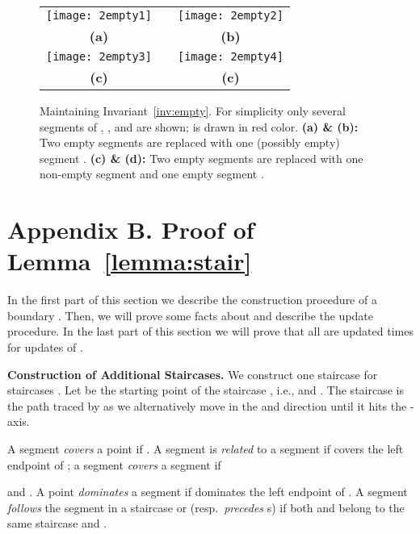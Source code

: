 \documentclass[10pt]{llncs}
\begin{document}
\begin{figure}[tbh]
  \centering
  \begin{tabular}{ccc}
  \texttt{[image: 2empty1]} & \hspace*{.7cm} &
  \texttt{[image: 2empty2]} \\
  {\bf (a)}   &  & {\bf(b)}  \\
  \texttt{[image: 2empty3]} & \hspace*{.7cm} &
  \texttt{[image: 2empty4]} \\
  {\bf (c)}   &  & {\bf(c)}  \\
  \end{tabular}
  \caption{{Maintaining Invariant~\ref{inv:empty}. For simplicity only 
      several segments of , , and  are shown; 
       is drawn in red color. \bf (a) \& (b):} Two empty segments are
    replaced with one (possibly empty) segment . 
    {\bf (c) \& (d):}  Two empty segments are replaced with one non-empty
    segment  and one empty segment . 
  }
  \label{fig:2empty}
\end{figure}
\newpage

\section*{Appendix B. Proof of Lemma~\ref{lemma:stair}}

In the first part of this section we describe the construction procedure 
of a boundary . 
Then, we will prove some facts about 
 and describe the update procedure. In the last part of this section 
we will prove that all  are
 updated  times for  updates of . 

{\bf Construction of  Additional  Staircases.}
We construct one staircase  for  staircases 
. 
Let  be the starting point of the
 staircase , i.e.,  and . 
The staircase   is the path traced by  as we alternatively
 move  in the  and  direction until it hits the -axis.



A segment  \emph{covers} a point  if .
A segment  is \emph{related} to a segment  if  covers the left 
endpoint of ; a segment  \emph{covers}  a segment  if
 
 and . A point  \emph{dominates} 
a segment  if  dominates the left endpoint of . A segment  
\emph{follows} the segment  in a staircase  or  
(resp.\  \emph{precedes} s) if 
both  and  belong to the same staircase and .
\end{document}
